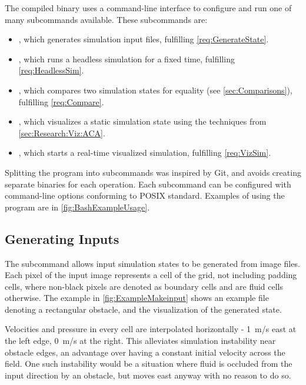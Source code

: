 The compiled binary uses a command-line interface to configure and run one of many subcommands available.
These subcommands are:\label{sec:DesignSubcommands}
\begin{itemize}
    \item {}, which generates simulation input files, fulfilling \cref{req:GenerateState}.
    \item {}, which runs a headless simulation for a fixed time, fulfilling \cref{req:HeadlessSim}.
    \item {}, which compares two simulation states for equality (see \cref{sec:Comparisons}), fulfilling \cref{req:Compare}.
    \item {}, which visualizes a static simulation state using the techniques from \cref{sec:Research:Viz:ACA}.
    \item {}, which starts a real-time visualized simulation, fulfilling \cref{req:VizSim}.
\end{itemize}
Splitting the program into subcommands was inspired by Git\cite{tool:Git}, and avoids creating separate binaries for each operation.
Each subcommand can be configured with command-line options conforming to POSIX standard\cite{IEEE2018UtilityConventions}.
Examples of using the program are in \cref{fig:BashExampleUsage}.


\subsection{Generating Inputs}
The  subcommand allows input simulation states to be generated from image files.
Each pixel of the input image represents a cell of the grid, not including padding cells, where non-black pixels are denoted as boundary cells and are fluid cells otherwise.
The example in \cref{fig:ExampleMakeinput} shows an example file denoting a rectangular obstacle, and the visualization of the generated state.


Velocities and pressure in every cell are interpolated horizontally - \SI{1}{m/s} east at the left edge, \SI{0}{m/s} at the right.
This alleviates simulation instability near obstacle edges, an advantage over having a constant initial velocity across the field.
One such instability would be a situation where fluid is occluded from the input direction by an obstacle, but moves east anyway with no reason to do so.

